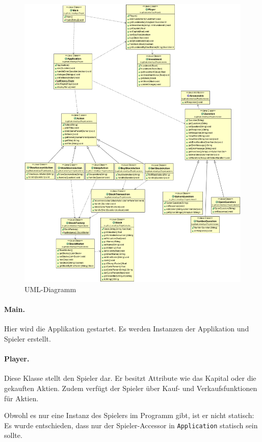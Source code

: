 \documentclass[paper=a4, fontsize=11pt]{scrartcl}
\numberwithin{equation}{section}		%
\numberwithin{figure}{section}			%
\numberwithin{table}{section}				%
\begin{document}
	\begin{figure}[!htbp]
		\centering
		\includegraphics[width=\linewidth]{UML1}
		\caption{UML-Diagramm}
		\label{fig:uml}
	\end{figure}
	
	\paragraph{Main.} Hier wird die Applikation gestartet. Es werden Instanzen der Applikation und Spieler erstellt.
	
	\paragraph{Player.} Diese Klasse stellt den Spieler dar. Er besitzt Attribute wie das Kapital oder die gekauften Aktien. Zudem verfügt der Spieler über Kauf- und Verkaufsfunktionen für Aktien.
	
	Obwohl es nur eine Instanz des Spielers im Programm gibt, ist er nicht statisch: Es wurde entschieden, dass nur der Spieler-Accessor in \texttt{Application} statisch sein sollte.
	
\end{document}
